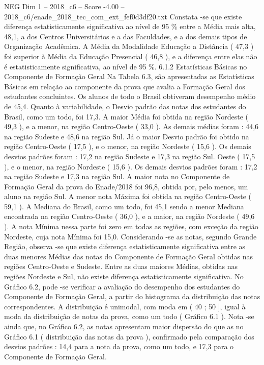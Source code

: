 \begin{textsample}{NEG Dim 1 – 2018\_c6 – Score -4.00 – 2018\_c6/enade\_2018\_tec\_com\_ext\_fef0d3df20.txt}
Constata -se que existe diferença estatisticamente significativa ao nível de 95 \% entre a Média mais alta, 48,1, a dos Centros Universitários e a das Faculdades, e a dos demais tipos de Organização Acadêmica.
A Média da Modalidade Educação a Distância ( 47,3 ) foi superior à Média da Educação Presencial ( 46,8 ), e a diferença entre elas não é estatisticamente significativa, ao nível de 95 \%. 6.1.2 Estatísticas Básicas no Componente de Formação Geral Na Tabela 6.3, são apresentadas as Estatísticas Básicas em relação ao componente da prova que avalia a Formação Geral dos estudantes concluintes.
Os alunos de todo o Brasil obtiveram desempenho médio de 45,4.
Quanto à variabilidade, o Desvio padrão das notas dos estudantes do Brasil, como um todo, foi 17,3.
A maior Média foi obtida na região Nordeste ( 49,3 ), e a menor, na região Centro-Oeste ( 33,0 ).
As demais médias foram : 44,6 na região Sudeste e 48,6 na região Sul.
Já o maior Desvio padrão foi obtido na região Centro-Oeste ( 17,5 ), e o menor, na região Nordeste ( 15,6 ).
Os demais desvios padrões foram : 17,2 na região Sudeste e 17,3 na região Sul.
Oeste ( 17,5 ), e o menor, na região Nordeste ( 15,6 ).
Os demais desvios padrões foram : 17,2 na região Sudeste e 17,3 na região Sul.
A maior nota no Componente de Formação Geral da prova do Enade/2018 foi 96,8, obtida por, pelo menos, um aluno na região Sul.
A menor nota Máxima foi obtida na região Centro-Oeste ( 59,1 ).
A Mediana do Brasil, como um todo, foi 45,1 sendo a menor Mediana encontrada na região Centro-Oeste ( 36,0 ), e a maior, na região Nordeste ( 49,6 ).
A nota Mínima nessa parte foi zero em todas as regiões, com exceção da região Nordeste, cuja nota Mínima foi 15,0.
Considerando -se as notas, segundo Grande Região, observa -se que existe diferença estatisticamente significativa entre as duas menores Médias das notas do Componente de Formação Geral obtidas nas regiões Centro-Oeste e Sudeste.
Entre as duas maiores Médias, obtidas nas regiões Nordeste e Sul, não existe diferença estatisticamente significativa.
No Gráfico 6.2, pode -se verificar a avaliação do desempenho dos estudantes do Componente de Formação Geral, a partir do histograma da distribuição das notas correspondentes.
A distribuição é unimodal, com moda em ( 40 ; 50 ], igual à moda da distribuição de notas da prova, como um todo ( Gráfico 6.1 ).
Nota -se ainda que, no Gráfico 6.2, as notas apresentam maior dispersão do que as no Gráfico 6.1 ( distribuição das notas da prova ), confirmado pela comparação dos desvios padrões : 14,4 para a nota da prova, como um todo, e 17,3 para o Componente de Formação Geral.

\end{textsample}
